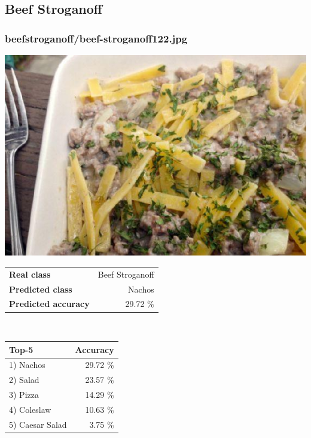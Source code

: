 \subsection{Beef Stroganoff}
    
\subsubsection{beef\textunderscore stroganoff/beef-stroganoff122.jpg}

\begin{minipage}[t]{0.4\textwidth}
	\vspace{0pt}
	\includegraphics[width=\linewidth]{images/evaluation-images/beef_stroganoff/beef-stroganoff122.jpg}
\end{minipage}
\hfill
\begin{minipage}[t]{0.5\textwidth}
	\vspace{0pt}\raggedright
	\begin{tabularx}{\textwidth}{X r}
		\small \textbf{Real class} & \small Beef Stroganoff\\
		\small \textbf{Predicted class} & \small Nachos\\
		\small \textbf{Predicted accuracy} & \small 29.72 \%
    \end{tabularx}\\
    
    \vspace{6pt}
	\begin{tabularx}{\textwidth}{X r}
        \small \textbf{Top-5} & \small \textbf{Accuracy} \\
        \hline
		\small 1) Nachos & \small 29.72 \%\\\small 2) Salad & \small 23.57 \%\\\small 3) Pizza & \small 14.29 \%\\\small 4) Coleslaw & \small 10.63 \%\\\small 5) Caesar Salad & \small 3.75 \%
    \end{tabularx}
\end{minipage}
    
